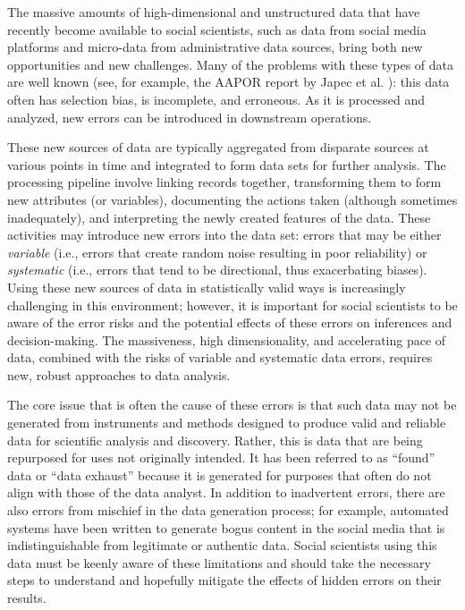 \documentclass[]{krantz}
\begin{document}
The massive amounts of high-dimensional and unstructured data that have
recently become available to social scientists, such as data from social
media platforms and micro-data from administrative data sources, bring
both new opportunities and new challenges. Many of the problems with
these types of data are well known (see, for example, the AAPOR report
by Japec et al. \citet{japec2015big}): this data often has selection
bias, is incomplete, and erroneous. As it is processed and analyzed, new
errors can be introduced in downstream operations.

These new sources of data are typically aggregated from disparate
sources at various points in time and integrated to form data sets for
further analysis. The processing pipeline involve linking records
together, transforming them to form new attributes (or variables),
documenting the actions taken (although sometimes inadequately), and
interpreting the newly created features of the data. These activities
may introduce new errors into the data set: errors that may be either
\emph{variable} (i.e., errors that create random noise resulting in poor
reliability) or \emph{systematic} (i.e., errors that tend to be
directional, thus exacerbating biases). Using these new sources of data
in statistically valid ways is increasingly challenging in this
environment; however, it is important for social scientists to be aware
of the error risks and the potential effects of these errors on
inferences and decision-making. The massiveness, high dimensionality,
and accelerating pace of data, combined with the risks of variable and
systematic data errors, requires new, robust approaches to data
analysis.

The core issue that is often the cause of these errors is that such data
may not be generated from instruments and methods designed to produce
valid and reliable data for scientific analysis and discovery. Rather,
this is data that are being repurposed for uses not originally intended.
It has been referred to as ``found'' data or ``data exhaust'' because it
is generated for purposes that often do not align with those of the data
analyst. In addition to inadvertent errors, there are also errors from
mischief in the data generation process; for example, automated systems
have been written to generate bogus content in the social media that is
indistinguishable from legitimate or authentic data. Social scientists
using this data must be keenly aware of these limitations and should
take the necessary steps to understand and hopefully mitigate the
effects of hidden errors on their results.
\end{document}
